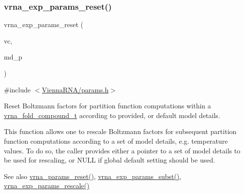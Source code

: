 \subsubsection{\texorpdfstring{vrna\+\_\+exp\+\_\+params\+\_\+reset()}{vrna\_exp\_params\_reset()}}
{\footnotesize\ttfamily vrna\+\_\+exp\+\_\+params\+\_\+reset (\begin{DoxyParamCaption}\item[{\mbox{\hyperlink{group__fold__compound_ga1b0cef17fd40466cef5968eaeeff6166}{vrna\+\_\+fold\+\_\+compound\+\_\+t}} $\ast$}]{vc,  }\item[{\mbox{\hyperlink{group__model__details_ga1f8a10e12a0a1915f2a4eff0b28ea17c}{vrna\+\_\+md\+\_\+t}} $\ast$}]{md\+\_\+p }\end{DoxyParamCaption})}



{\ttfamily \#include $<$\mbox{\hyperlink{params_8h}{Vienna\+R\+N\+A/params.\+h}}$>$}



Reset Boltzmann factors for partition function computations within a \mbox{\hyperlink{group__fold__compound_ga1b0cef17fd40466cef5968eaeeff6166}{vrna\+\_\+fold\+\_\+compound\+\_\+t}} according to provided, or default model details. 

This function allows one to rescale Boltzmann factors for subsequent partition function computations according to a set of model details, e.\+g. temperature values. To do so, the caller provides either a pointer to a set of model details to be used for rescaling, or N\+U\+LL if global default setting should be used.

\begin{DoxySeeAlso}{See also}
\mbox{\hyperlink{group__energy__parameters_gac40dc82e48a72a97cfc58b9da08a7792}{vrna\+\_\+params\+\_\+reset()}}, \mbox{\hyperlink{group__energy__parameters_ga8e7ac4fab3b0cc03afbc134eaafb3525}{vrna\+\_\+exp\+\_\+params\+\_\+subst()}}, \mbox{\hyperlink{group__energy__parameters_gad607bc3a5b5da16400e2ca4ea5560233}{vrna\+\_\+exp\+\_\+params\+\_\+rescale()}} 
\end{DoxySeeAlso}

